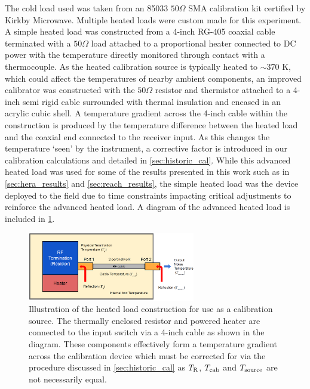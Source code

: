 The cold load used was taken from an 85033 $50 \Omega$ SMA calibration kit certified by Kirkby Microwave. Multiple heated loads were custom made for this experiment. A simple heated load was constructed from a 4-inch RG-405 coaxial cable terminated with a $50 \Omega$ load attached to a proportional heater connected to DC power with the temperature directly monitored through contact with a thermocouple. As the heated calibration source is typically heated to $\sim 370$ K, which could affect the temperatures of nearby ambient components, an improved calibrator was constructed with the $50 \Omega$ resistor and thermistor attached to a 4-inch semi rigid cable surrounded with thermal insulation and encased in an acrylic cubic shell. A temperature gradient across the 4-inch cable within the construction is produced by the temperature difference between the heated load and the coaxial end connected to the receiver input. As this changes the temperature ‘seen’ by the instrument, a corrective factor is introduced in our calibration calculations and detailed in \cref{sec:historic_cal}. While this advanced heated load was used for some of the results presented in this work such as in \cref{sec:hera_results} and \cref{sec:reach_results}, the simple heated load was the device deployed to the field due to time constraints impacting critical adjustments to reinforce the advanced heated load. A diagram of the advanced heated load is included in \cref{fig:hot_load}.
\begin{figure}
    \centering
    \includegraphics[width=0.65\textwidth]{hot_load}
    \caption{Illustration of the heated load construction for use as a calibration source. The thermally enclosed resistor and powered heater are connected to the input switch via a 4-inch cable as shown in the diagram. These components effectively form a temperature gradient across the calibration device which must be corrected for via the procedure discussed in \cref{sec:historic_cal} as $T_{\mathrm{R}}$, $T_{\mathrm{cab}}$ and $T_{\mathrm{source}}$ are not necessarily equal.}
    \label{fig:hot_load}
\end{figure}

